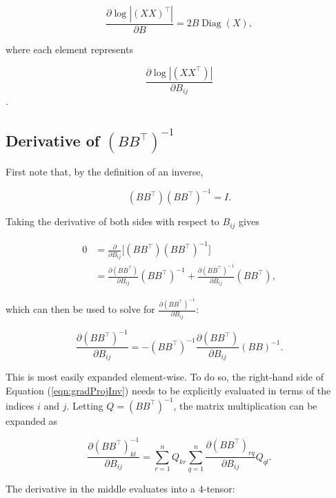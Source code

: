 \documentclass[12pt]{article}
\theoremstyle{definition}
\DeclareMathOperator{\Diag}{Diag}
\begin{document}
\begin{equation}
    \label{eqn:gradLogDetMatrix}
    \frac{\partial \log |(XX)^\top|}{\partial B} = 2B \Diag(X),
\end{equation}

where each element represents 

\[\frac{\partial \log |(XX^\top)|}{\partial B_{ij}}\].

\subsection{Derivative of $(BB^\top)^{-1}$}
\label{subsec:gradProjInvDerivation}

First note that, by the definition of an inverse,

\[
(BB^\top)(BB^\top)^{-1} = I.
\]

Taking the derivative of both sides with respect to $B_{ij}$ gives

\[
\begin{split}
    0 & = \frac{\partial}{\partial B_{ij}} \big[(BB^\top)(BB^\top)^{-1} \big] \\ 
    & = \frac{\partial (BB^\top)}{\partial B_{ij}} (BB^\top)^{-1} + \frac{\partial (BB^\top)^{-1}}{\partial B_{ij}} (BB^\top),
\end{split}
\]

which can then be used to solve for $\frac{\partial (BB^\top)^{-1}}{\partial B_{ij}}$:

\begin{equation}
    \label{eqn:gradProjInv}
    \frac{\partial (BB^\top)^{-1}}{\partial B_{ij}} = -(BB^\top)^{-1} \frac{\partial (BB^\top)}{\partial B_{ij}} (BB)^{-1}.
\end{equation}

This is most easily expanded element-wise. To do so, the right-hand side of Equation (\ref{eqn:gradProjInv}) needs to be explicitly evaluated in terms of the indices $i$ and $j$. Letting $Q = (BB^\top)^{-1}$, the matrix multiplication can be expanded as

\begin{equation}
    \label{eqn:gradProjInvHighLevel}
    \frac{\partial (BB^\top)^{-1}_{kl}}{\partial B_{ij}} = \sum_{r=1}^{n} Q_{kr} \sum_{q=1}^{n} \frac{\partial (BB^\top)_{rq}}{\partial B_{ij}} Q_{ql}.
\end{equation}

The derivative in the middle evaluates into a $4$-tensor:
\end{document}

